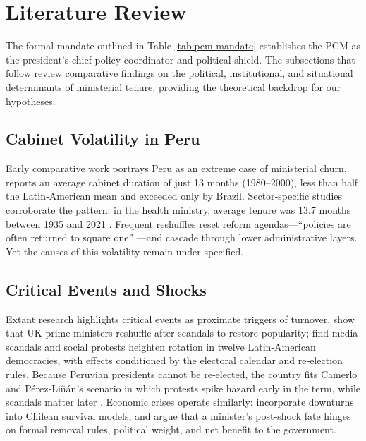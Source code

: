 \documentclass[a4paper, 12pt]{article}
\begin{document}
\section{Literature Review}\label{sec:letrev}

The formal mandate outlined in Table \ref{tab:pcm-mandate} establishes the PCM as the president’s chief policy coordinator and political shield. The subsections that follow review comparative findings on the political, institutional, and situational determinants of ministerial tenure, providing the theoretical backdrop for our hypotheses.


\subsection{Cabinet Volatility in Peru}

Early comparative work portrays Peru as an extreme case of ministerial churn.  \citet{martinez-gallardo_out_2012} reports an average cabinet duration of just 13 months (1980–2000), less than half the Latin‑American mean and exceeded only by Brazil.  Sector‑specific studies corroborate the pattern: in the health ministry, average tenure was 13.7 months between 1935 and 2021 \citep{gozzer_duracion_2021}.  Frequent reshuffles reset reform agendas—“policies are often returned to square one” \citealp[335]{gozzer_duracion_2021} —and cascade through lower administrative layers.  Yet the causes of this volatility remain under‑specified.

\subsection{Critical Events and Shocks}

Extant research highlights critical events as proximate triggers of turnover.  \citet{dewan_corrective_2005} show that UK prime ministers reshuffle after scandals to restore popularity; \citet{camerlo_minister_2015-1} find media scandals and social protests heighten rotation in twelve Latin‑American democracies, with effects conditioned by the electoral calendar and re‑election rules.  Because Peruvian presidents cannot be re‑elected, the country fits Camerlo and Pérez‑Liñán’s scenario in which protests spike hazard early in the term, while scandals matter later \citet[616]{camerlo_minister_2015-1}. Economic crises operate similarly: \citet{gonzalez-bustamante_cambios_2016} incorporate downturns into Chilean survival models, and \citet[515]{fischer_duration_2012} argue that a minister’s post‑shock fate hinges on formal removal rules, political weight, and net benefit to the government.
\end{document}
